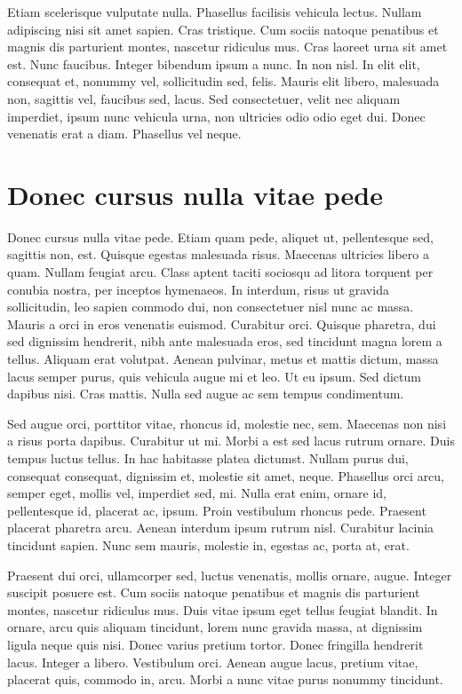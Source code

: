 \documentclass[eng,printmode]{mgr}
\begin{document}
Etiam scelerisque vulputate nulla. Phasellus facilisis vehicula lectus. Nullam adipiscing nisi sit amet sapien. Cras tristique. Cum sociis natoque penatibus et magnis dis parturient montes, nascetur ridiculus mus. Cras laoreet urna sit amet est. Nunc faucibus. Integer bibendum ipsum a nunc. In non nisl. In elit elit, consequat et, nonummy vel, sollicitudin sed, felis. Mauris elit libero, malesuada non, sagittis vel, faucibus sed, lacus. Sed consectetuer, velit nec aliquam imperdiet, ipsum nunc vehicula urna, non ultricies odio odio eget dui. Donec venenatis erat a diam. Phasellus vel neque.

\appendix
\chapter{Donec cursus nulla vitae pede}
Donec cursus nulla vitae pede. Etiam quam pede, aliquet ut, pellentesque sed, sagittis non, est. Quisque egestas malesuada risus. Maecenas ultricies libero a quam. Nullam feugiat arcu. Class aptent taciti sociosqu ad litora torquent per conubia nostra, per inceptos hymenaeos. In interdum, risus ut gravida sollicitudin, leo sapien commodo dui, non consectetuer nisl nunc ac massa. Mauris a orci in eros venenatis euismod. Curabitur orci. Quisque pharetra, dui sed dignissim hendrerit, nibh ante malesuada eros, sed tincidunt magna lorem a tellus. Aliquam erat volutpat. Aenean pulvinar, metus et mattis dictum, massa lacus semper purus, quis vehicula augue mi et leo. Ut eu ipsum. Sed dictum dapibus nisi. Cras mattis. Nulla sed augue ac sem tempus condimentum. 

Sed augue orci, porttitor vitae, rhoncus id, molestie nec, sem. Maecenas non nisi a risus porta dapibus. Curabitur ut mi. Morbi a est sed lacus rutrum ornare. Duis tempus luctus tellus. In hac habitasse platea dictumst. Nullam purus dui, consequat consequat, dignissim et, molestie sit amet, neque. Phasellus orci arcu, semper eget, mollis vel, imperdiet sed, mi. Nulla erat enim, ornare id, pellentesque id, placerat ac, ipsum. Proin vestibulum rhoncus pede. Praesent placerat pharetra arcu. Aenean interdum ipsum rutrum nisl. Curabitur lacinia tincidunt sapien. Nunc sem mauris, molestie in, egestas ac, porta at, erat. 

Praesent dui orci, ullamcorper sed, luctus venenatis, mollis ornare, augue. Integer suscipit posuere est. Cum sociis natoque penatibus et magnis dis parturient montes, nascetur ridiculus mus. Duis vitae ipsum eget tellus feugiat blandit. In ornare, arcu quis aliquam tincidunt, lorem nunc gravida massa, at dignissim ligula neque quis nisi. Donec varius pretium tortor. Donec fringilla hendrerit lacus. Integer a libero. Vestibulum orci. Aenean augue lacus, pretium vitae, placerat quis, commodo in, arcu. Morbi a nunc vitae purus nonummy tincidunt. 
\end{document}
